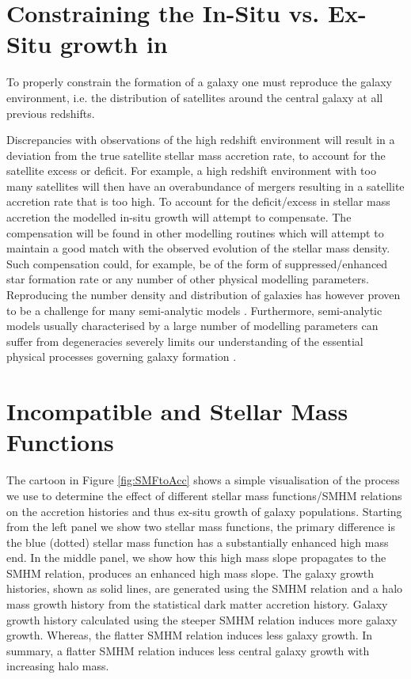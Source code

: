 \section{Constraining the In-Situ vs. Ex-Situ growth in \steel}
To properly constrain the formation of a galaxy one must reproduce the galaxy environment, i.e. the distribution of satellites around the central galaxy at all previous redshifts. 

Discrepancies with observations of the high redshift environment will result in a deviation from the true satellite stellar mass accretion rate, to account for the satellite excess or deficit. For example, a high redshift environment with too many satellites will then have an overabundance of mergers resulting in a satellite accretion rate that is too high. To account for the deficit/excess in stellar mass accretion the modelled in-situ growth will attempt to compensate. The compensation will be found in other modelling routines which will attempt to maintain a good match with the observed evolution of the stellar mass density. Such compensation could, for example, be of the form of suppressed/enhanced star formation rate or any number of other physical modelling parameters. Reproducing the number density and distribution of galaxies has however proven to be a challenge for many semi-analytic models \citep[e.g.][]{Asquith2018CosmicModels}. Furthermore, semi-analytic models usually characterised by a large number of modelling parameters can suffer from degeneracies severely limits our understanding of the essential physical processes governing galaxy formation \citep[e.g.][]{Lapi2011Herschel-atlasGalaxies, Gonzalez2011Evolution4}.


\section{Incompatible \LCDM and Stellar Mass Functions}
The cartoon in Figure \ref{fig:SMFtoAcc} shows a simple visualisation of the process we use to determine the effect of different stellar mass functions/SMHM relations on the accretion histories and thus ex-situ growth of galaxy populations. 
Starting from the left panel we show two stellar mass functions, the primary difference is the blue (dotted) stellar mass function has a substantially enhanced high mass end. 
In the middle panel, we show how this high mass slope propagates to the SMHM relation, produces an enhanced high mass slope. 
The galaxy growth histories, shown as solid lines, are generated using the SMHM relation and a halo mass growth history from the statistical dark matter accretion history.
Galaxy growth history calculated using the steeper SMHM relation induces more galaxy growth. Whereas, the flatter SMHM relation induces less galaxy growth. In summary, a flatter SMHM relation induces less central galaxy growth with increasing halo mass.

